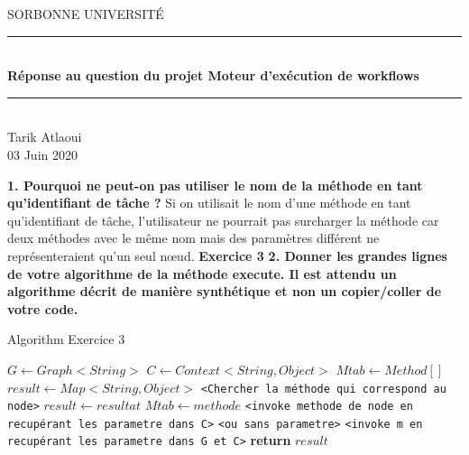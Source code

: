 \documentclass{article}
\date{\today}
\author{Tarik Atlaoui}
\begin{document}
\makeatletter
\def\BState{\State\hskip-\ALG@thistlm}
\makeatother

\begin{titlepage}
	\enlargethispage{2cm}
	\newcommand{\HRule}{\rule{\linewidth}{0.5mm}}
	\center
	\textsc{\LARGE
	SORBONNE UNIVERSITÉ 
	} \\[1cm]
	\HRule \\[0.4cm]
	{ \huge \bfseries Réponse au question du projet Moteur d’exécution de workflows \\[0.15cm] }
	\HRule \\[4cm]
	\large{Tarik Atlaoui} \\[3cm]
	03 Juin 2020 \\[3cm]

\end{titlepage}
                                                                                                                         
\textbf{1. Pourquoi ne peut-on pas utiliser le nom de la méthode en tant qu’identifiant de tâche ?}
\newline
\newline
Si on utilisait le nom d'une méthode en tant qu'identifiant de tâche,
 l'utilisateur ne pourrait pas surcharger la méthode car deux méthodes avec le même nom mais
  des paramètres différent ne représenteraient qu'un seul nœud. 
\newline
\newline
\textbf{Exercice 3}
\newline
\newline
\textbf{2. Donner les grandes lignes de votre algorithme de la méthode execute. Il est attendu un
algorithme décrit de manière synthétique et non un copier/coller de votre code.}

\begin{algorithm}
  \caption{Algorithm Exercice 3}\label{euclid}
  \begin{algorithmic}[1]
      \State $G\gets Graph<String>$
      \State $C\gets Context<String , Object>$
      \State $Mtab\gets Method[]$
      \State $result\gets Map<String , Object>$
        \State \texttt{<Chercher la méthode qui correspond au node>}      
          \State $result\gets resultat$
          \State $Mtab\gets methode$
        \Else 
        \State \texttt{<invoke methode de node en recupérant les parametre dans C>}
        \State \texttt{<ou sans parametre>}
        \EndIf  
        \EndFor
        \State 
       
        \State \texttt{<invoke m en recupérant les parametre dans G et C>}
      \EndFor
      \State \textbf{return} $result$
    \EndProcedure
  \end{algorithmic}
\end{algorithm}
\end{document}
